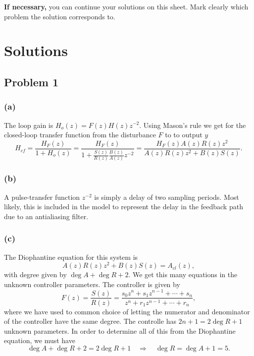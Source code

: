 \documentclass[letterpaper,11pt]{article}
\newcommand{\bmpl}{\begin{minipage}[t]{\textwidth}}
\newcommand{\emp}{\end{minipage}}
\begin{document}
\noindent
\fbox{
\bmpl
{\bf Calculations and answers:}\\
\vspace*{110mm}
\emp}
\cleardoublepage

\noindent
{\bf If necessary,} you can continue your solutions on this sheet. Mark clearly which problem the solution corresponds to.


\section*{Solutions}
\subsection*{Problem 1}
\subsubsection*{(a)}
The loop gain is \(H_o(z) = F(z)H(z)z^{-2}\). Using Mason's rule we get for the closed-loop transfer function from the disturbance $F$ to to output $y$
\[ H_{cf} = \frac{H_F(z)}{1 + H_o(z)} = \frac{H_F(z)}{1 + \frac{S(z)}{R(z)}\frac{B(z)}{A(z)}z^{-2}}
          = \frac{H_F(z)A(z)R(z)z^2}{A(z)R(z)z^2 + B(z)S(z)}.\]

\subsubsection*{(b)}
A pulse-transfer function \(z^{-2}\) is simply a delay of two sampling periods. Most likely, this is included in the model to represent the delay in the feedback path due to an antialiasing filter.

\subsubsection*{(c)}
The Diophantine equation for this system is 
\[ A(z)R(z)z^2 + B(z)S(z) = A_{cl}(z),\]
with degree given by \( \deg A + \deg R + 2\). We get this many equations in the unknown controller parameters. The controller is given by 
\[F(z) = \frac{S(z)}{R(z)} = \frac{s_0z^n + s_1z^{n-1} + \cdots + s_n}{z^n + r_1z^{n-1} + \cdots + r_n},\]
where we have used to common choice of letting the numerator and denominator of the controller have the same degree. The controlle has \(2n + 1 = 2\deg R + 1\) unknown parameters. In order to determine all of this from the Diophantine equation, we must have
\[ \deg A + \deg R + 2 = 2\deg R + 1 \quad \Rightarrow \quad \deg R = \deg A + 1 = 5.\]
\end{document}
